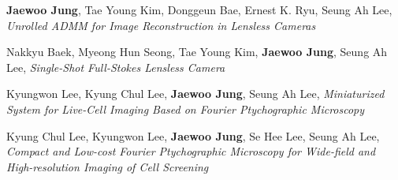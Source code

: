 \documentclass[a4paper,12pt]{memoir} %
\begin{document}


{}


\Sep %




{\textbf{Jaewoo Jung}, Tae Young Kim, Donggeun Bae, Ernest K. Ryu, Seung Ah Lee, \textit{Unrolled ADMM for Image Reconstruction in Lensless Cameras}}



{Nakkyu Baek, Myeong Hun Seong, Tae Young Kim, \textbf{Jaewoo Jung}, Seung Ah Lee, \textit{Single-Shot Full-Stokes Lensless Camera}}



{Kyungwon Lee, Kyung Chul Lee, \textbf{Jaewoo Jung}, Seung Ah Lee, \textit{Miniaturized System for Live-Cell Imaging Based on Fourier Ptychographic Microscopy}}



{Kyung Chul Lee, Kyungwon Lee, \textbf{Jaewoo Jung}, Se Hee Lee, Seung Ah Lee, \textit{Compact and Low-cost Fourier Ptychographic Microscopy for Wide-field and High-resolution Imaging of Cell Screening}}

\end{document}
